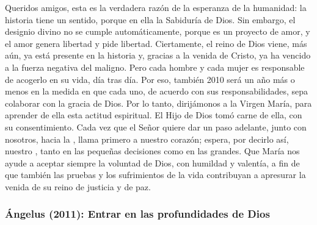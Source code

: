 \begin{body}
					Queridos amigos, esta es la verdadera razón de la esperanza de la humanidad: la historia tiene un sentido, porque en ella  la Sabiduría de Dios. Sin embargo, el designio divino no se cumple automáticamente, porque es un proyecto de amor, y el amor genera libertad y pide libertad. Ciertamente, el reino de Dios viene, más aún, ya está presente en la historia y, gracias a la venida de Cristo, ya ha vencido a la fuerza negativa del maligno. Pero cada hombre y cada mujer es responsable de acogerlo en su vida, día tras día. Por eso, también 2010 será un año más o menos  en la medida en que cada uno, de acuerdo con sus responsabilidades, sepa colaborar con la gracia de Dios. Por lo tanto, dirijámonos a la Virgen María, para aprender de ella esta actitud espiritual. El Hijo de Dios tomó carne de ella, con su consentimiento. Cada vez que el Señor quiere dar un paso adelante, junto con nosotros, hacia la , llama primero a nuestro corazón; espera, por decirlo así, nuestro , tanto en las pequeñas decisiones como en las grandes. Que María nos ayude a aceptar siempre la voluntad de Dios, con humildad y valentía, a fin de que también las pruebas y los sufrimientos de la vida contribuyan a apresurar la venida de su reino de justicia y de paz.
				\end{body}
			
			\subsubsection{Ángelus (2011): Entrar en las profundidades de Dios}
			
				
